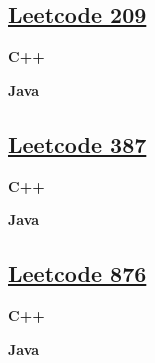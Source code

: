 \subsection{\href{https://leetcode-cn.com/}{Leetcode 209}}\label{app:codelist:leetcode:209}

\textbf{C++}\par


\textbf{Java}\par



\subsection{\href{https://leetcode-cn.com/}{Leetcode 387}}\label{app:codelist:leetcode:387}

\textbf{C++}\par


\textbf{Java}\par



\subsection{\href{https://leetcode-cn.com/}{Leetcode 876}}\label{app:codelist:leetcode:876}

\textbf{C++}\par


\textbf{Java}\par



